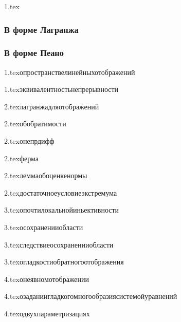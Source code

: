 {1.tex}{}
\subsubsection{В форме Лагранжа}
\subsubsection{В форме Пеано}

{1.tex}{опространствелинейныхотображений}

{1.tex}{эквивалентностьнепрерывности}

{2.tex}{лагранжадляотображений}

{2.tex}{обобратимости}

{2.tex}{онепрдифф}

{2.tex}{ферма}

{2.tex}{леммаобоценкенормы}

{2.tex}{достаточноеусловиеэкстремума}

{3.tex}{опочтилокальнойиньективности}

{3.tex}{осохраненииобласти}

{3.tex}{следствиеосохраненииобласти}

{3.tex}{огладкостиобратногоотображения}

{4.tex}{онеявномотображении}

{4.tex}{озаданиигладкогомногообразиясистемойуравнений}

{4.tex}{одвухпараметризациях}

